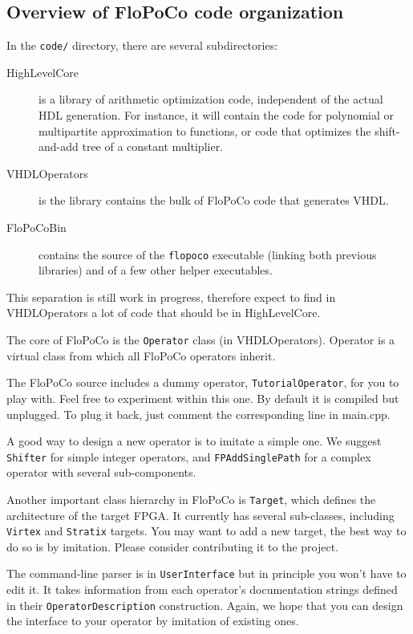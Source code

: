 \documentclass{article}
\begin{document}
\subsection{Overview of FloPoCo code organization}

In the \texttt{code/} directory, there are several subdirectories:
\begin{description}
\item[HighLevelCore] is a library of arithmetic optimization code, independent of the actual HDL generation. For instance, it will contain the code for polynomial or multipartite approximation to functions, or code that optimizes the shift-and-add tree of a constant multiplier.   
\item[VHDLOperators] is the library contains the bulk of FloPoCo code that generates VHDL. 
\item[FloPoCoBin] contains the source of the \texttt{flopoco} executable (linking both previous libraries) and of a few other helper executables.
\end{description}
This separation is still work in progress, therefore expect to find in VHDLOperators a lot of code that should be in HighLevelCore.

The core of FloPoCo is the \texttt{Operator} class  (in VHDLOperators). 
Operator is a virtual class from which all FloPoCo operators inherit. 

The FloPoCo source includes a dummy operator, \texttt{TutorialOperator}, for you to play with. 
Feel free to experiment within this one. 
By default it is compiled but unplugged. To plug it back, just comment the corresponding line in main.cpp.

A good way to design a new operator is to imitate a simple one. We suggest \texttt{Shifter} for simple integer operators, and \texttt{FPAddSinglePath} for a complex operator with several sub-components.

Another important class hierarchy in FloPoCo is \texttt{Target}, which
defines the architecture of the target FPGA. It currently has several sub-classes,
including \texttt{Virtex} and \texttt{Stratix} targets. You may want to
add a new target, the best way to do so is by imitation. Please
consider contributing it to the project.

The command-line parser is in \texttt{UserInterface} but in principle you won't have to edit it.
It takes information from each operator's documentation strings defined in their \texttt{OperatorDescription} construction. 
Again, we hope that you can design the interface to your operator by imitation of existing ones.
\end{document}
